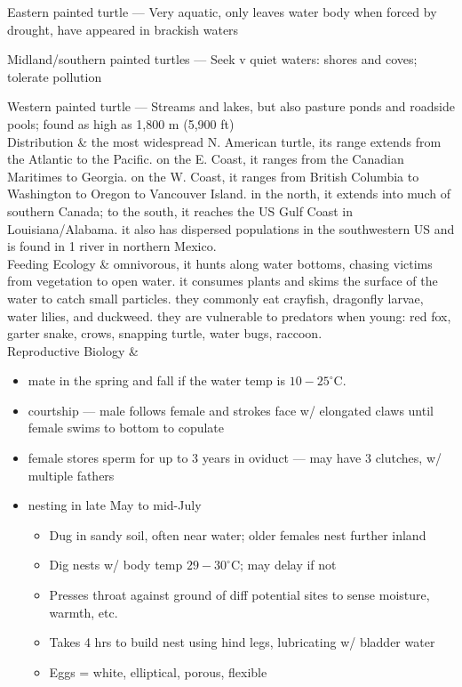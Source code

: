 \begin{center}
\begin{longtabu}
	Eastern painted turtle --- Very aquatic, only leaves water body when forced by drought, have appeared in brackish waters
	
	Midland/southern painted turtles --- Seek v quiet waters: shores and coves; tolerate pollution
	
	Western painted turtle --- Streams and lakes, but also pasture ponds and roadside pools; found as high as 1,800 m (5,900 ft)
	\\
	\hline
	Distribution & 
	the most widespread N. American turtle, its range extends from the Atlantic to the Pacific. on the E. Coast, it ranges from the Canadian Maritimes to Georgia. on the W. Coast, it ranges from British Columbia to Washington to Oregon to Vancouver Island. in the north, it extends into much of southern Canada; to the south, it reaches the US Gulf Coast in Louisiana/Alabama. it also has dispersed populations in the southwestern US and is found in 1 river in northern Mexico.
	\\
	\hline
	Feeding Ecology & 
	omnivorous, it hunts along water bottoms, chasing victims from vegetation to open water. it consumes plants and skims the surface of the water to catch small particles. they commonly eat crayfish, dragonfly larvae, water lilies, and duckweed. they are vulnerable to predators when young: red fox, garter snake, crows, snapping turtle, water bugs, raccoon.
	\\
	\hline
	Reproductive Biology & 
	\begin{itemize}[noitemsep]
		\item mate in the spring and fall if the water temp is $10-25^\circ$C.
		\item courtship --- male follows female and strokes face w/ elongated claws until female swims to bottom to copulate
		\item female stores sperm for up to 3 years in oviduct --- may have 3 clutches, w/ multiple fathers
		\item nesting in late May to mid-July
			\begin{itemize}[noitemsep]
				\item Dug in sandy soil, often near water; older females nest further inland
				\item Dig nests w/ body temp $29-30^\circ$C; may delay if not 
				\item Presses throat against ground of diff potential sites to sense moisture, warmth, etc.
				\item Takes 4 hrs to build nest using hind legs, lubricating w/ bladder water
				\item Eggs = white, elliptical, porous, flexible

\end{itemize}
\end{itemize}
\end{longtabu}
\end{center}

